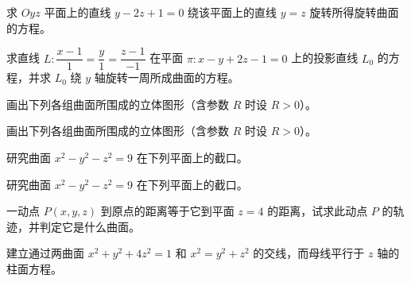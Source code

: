 \newpage
\noindent\begin{minipage}{\textwidth}
求 $Oyz$ 平面上的直线 $y-2z+1=0$ 绕该平面上的直线 $y=z$ 旋转所得旋转曲面的方程。
\end{minipage}\par\vfill
\noindent\begin{minipage}{\textwidth}
求直线 $L:\dfrac{x-1}{1}=\dfrac{y}{1}=\dfrac{z-1}{-1}$ 在平面 $\pi:x-y+2z-1=0$ 上的投影直线 $L_0$ 的方程，并求 $L_0$ 绕 $y$ 轴旋转一周所成曲面的方程。
\end{minipage}\par\vfill
\noindent\begin{minipage}{\textwidth}
画出下列各组曲面所围成的立体图形（含参数 $R$ 时设 $R>0$）。
\end{minipage}\par\vfill
\noindent\begin{minipage}{\textwidth}
画出下列各组曲面所围成的立体图形（含参数 $R$ 时设 $R>0$）。
\end{minipage}\par\vfill
\newpage
\noindent\begin{minipage}{\textwidth}
研究曲面 $x^2-y^2-z^2=9$ 在下列平面上的截口。
\end{minipage}\par\vfill
\noindent\begin{minipage}{\textwidth}
研究曲面 $x^2-y^2-z^2=9$ 在下列平面上的截口。
\end{minipage}\par\vfill
\noindent\begin{minipage}{\textwidth}
一动点 $P(x,y,z)$ 到原点的距离等于它到平面 $z=4$ 的距离，试求此动点 $P$ 的轨迹，并判定它是什么曲面。
\end{minipage}\par\vfill
\noindent\begin{minipage}{\textwidth}
建立通过两曲面 $x^2+y^2+4z^2=1$ 和 $x^2=y^2+z^2$ 的交线，而母线平行于 $z$ 轴的柱面方程。
\end{minipage}\par\vfill
